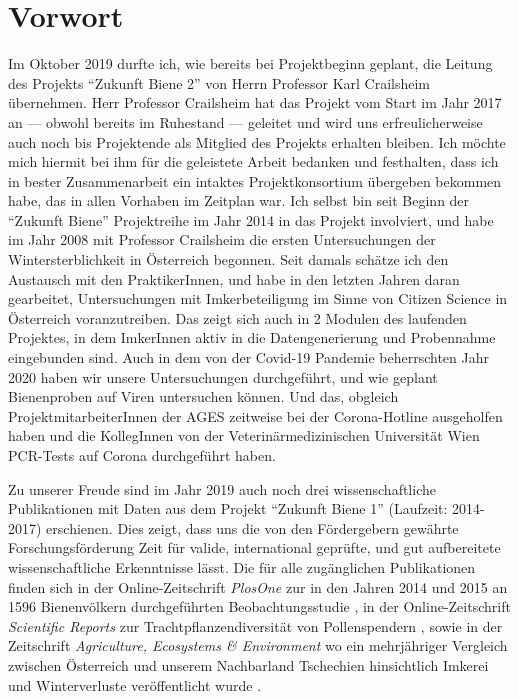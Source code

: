 {}
\section*{Vorwort}

Im Oktober 2019 durfte ich, wie bereits bei Projektbeginn geplant, die Leitung des Projekts \enquote{Zukunft Biene 2} von Herrn Professor Karl Crailsheim übernehmen. Herr Professor Crailsheim hat das Projekt vom Start im Jahr 2017 an --- obwohl bereits im Ruhestand --- geleitet und wird uns erfreulicherweise auch noch bis Projektende als Mitglied des Projekts erhalten bleiben. Ich möchte mich hiermit bei ihm für die geleistete Arbeit bedanken und festhalten, dass ich in bester Zusammenarbeit ein intaktes Projektkonsortium übergeben bekommen habe, das in allen Vorhaben im Zeitplan war. Ich selbst bin seit Beginn der \enquote{Zukunft Biene} Projektreihe im Jahr 2014 in das Projekt involviert, und habe im Jahr 2008 mit Professor Crailsheim die ersten Untersuchungen der Wintersterblichkeit in Österreich begonnen. Seit damals schätze ich den Austausch mit den PraktikerInnen, und habe in den letzten Jahren daran gearbeitet, Untersuchungen mit Imkerbeteiligung im Sinne von Citizen Science in Österreich voranzutreiben. Das zeigt sich auch in 2 Modulen des laufenden Projektes, in dem ImkerInnen aktiv in die Datengenerierung und Probennahme eingebunden sind. Auch in dem von der Covid-19 Pandemie beherrschten Jahr 2020 haben wir unsere Untersuchungen durchgeführt, und wie geplant Bienenproben auf Viren untersuchen können. Und das, obgleich ProjektmitarbeiterInnen der AGES zeitweise bei der Corona-Hotline ausgeholfen haben und die KollegInnen von der Veterinärmedizinischen Universität Wien PCR-Tests auf Corona durchgeführt haben.

Zu unserer Freude sind im Jahr 2019 auch noch drei wissenschaftliche Publikationen mit Daten aus dem Projekt \enquote{Zukunft Biene 1} (Laufzeit: 2014-2017) erschienen. Dies zeigt, dass uns die von den Fördergebern gewährte Forschungsförderung Zeit für valide, international geprüfte, und gut aufbereitete wissenschaftliche Erkenntnisse lässt. Die für alle zugänglichen Publikationen finden sich in der Online-Zeitschrift \textit{PlosOne} zur in den Jahren 2014 und 2015 an 1596 Bienenvölkern durchgeführten
Beobachtungsstudie \citep{morawetz2019}, in der Online-Zeitschrift \textit{Scientific Reports} zur Trachtpflanzendiversität von Pollenspendern \citep{brodschneider2019a}, sowie in der Zeitschrift \textit{Agriculture, Ecosystems \& Environment} wo ein mehrjähriger Vergleich zwischen Österreich und unserem Nachbarland Tschechien hinsichtlich Imkerei und Winterverluste veröffentlicht wurde \citep{brodschneider2019}.

